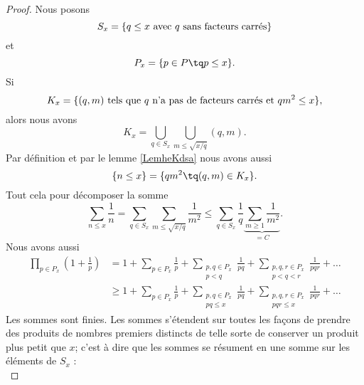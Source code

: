 \begin{proof}
    Nous posons
    \begin{equation}
        S_x=\{ \text{\( q\leq x\) avec \( q\) sans facteurs carrés} \}
    \end{equation}
    et
    \begin{equation}
        P_x=\{ p\in P\tq p\leq x \}.
    \end{equation}
    Si
    \begin{equation}
        K_x=\{ \text{\( (q,m)\) tels que \( q\) n'a pas de facteurs carrés et \( qm^2\leq x\)} \},
    \end{equation}
    alors nous avons
    \begin{equation}
        K_x=\bigcup_{q\in S_x}\bigcup_{m\leq \sqrt{x/q}}(q,m).
    \end{equation}
    Par définition et par le lemme \ref{LemheKdsa} nous avons aussi
    \begin{equation}
        \{ n\leq x \}=\{ qm^2\tq (q,m)\in K_x \}.
    \end{equation}
    Tout cela pour décomposer la somme
    \begin{equation}        \label{EqpoJpuC}
        \sum_{n\leq x}\frac{1}{ n }=\sum_{q\in S_x}\sum_{m\leq\sqrt{x/q}}\frac{1}{ m^2 }\leq \sum_{q\in S_x}\frac{1}{ q }\underbrace{\sum_{m\geq 1}\frac{1}{ m^2 }}_{=C}.
    \end{equation}
    Nous avons aussi
    \begin{subequations}
        \begin{align}
            \prod_{p\in P_x}\left( 1+\frac{1}{ p } \right)&=1+\sum_{p\in P_x}\frac{1}{ p }+\sum_{\substack{p,q\in P_x\\p<q}}\frac{1}{ pq }+\sum_{\substack{p,q,r\in P_x\\p<q<r}}\frac{1}{ pqr }+\ldots\\
            &\geq 1+\sum_{p\in P_x}\frac{1}{ p }+\sum_{\substack{p,q\in P_x\\pq\leq x}}\frac{1}{ pq }+\sum_{\substack{p,q,r\in P_x\\pqr\leq x}}\frac{1}{ pqr }+\ldots
        \end{align}
    \end{subequations}
    Les sommes sont finies. Les sommes s'étendent sur toutes les façons de prendre des produits de nombres premiers distincts de telle sorte de conserver un produit plus petit que \( x\); c'est à dire que les sommes se résument en une somme sur les éléments de \( S_x\) :
    \begin{equation}        \label{EqooilOz}

\end{equation}
\end{proof}
